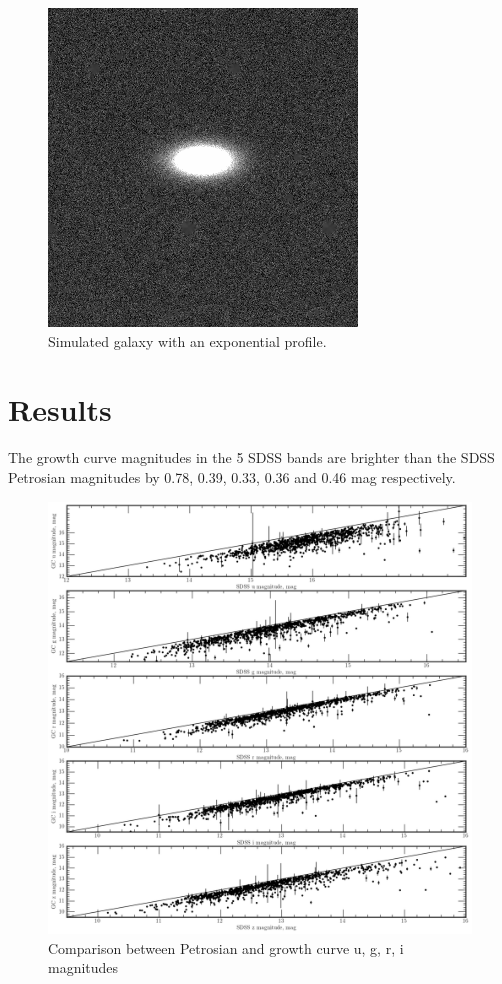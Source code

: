 \documentclass[apj, onecolumn]{emulateapj}
\begin{document}
\begin{figure}[h]
\centering
\includegraphics[scale=0.6]{img/test_expDisk}
\caption{Simulated galaxy with an exponential profile.}
\label{fig:test}
\end{figure}


\section*{Results}

The growth curve magnitudes in the 5 SDSS bands are brighter than the SDSS Petrosian magnitudes by 0.78, 0.39, 0.33, 0.36 and 0.46 mag respectively. 

\begin{figure}[h]
\centering
\includegraphics[scale=0.5]{img/all_SDSS_vs_GC}
\caption{Comparison between Petrosian and growth curve u, g, r, i magnitudes}
\label{fig:app_mag_comparison}
\end{figure}







\clearpage
\end{document}
